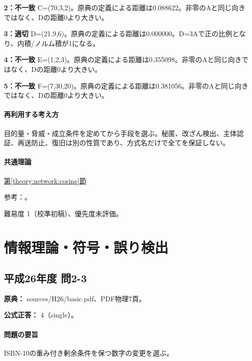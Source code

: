 \noindent\textbf{2：不一致} C=\allowbreak{}(70,3,2)。原典の定義による距離は0.088622。非零のAと同じ向きではなく、Dの距離0より大きい。\par

\noindent\textbf{3：適切} D=\allowbreak{}(21,9,6)。原典の定義による距離は0.000000。D=\allowbreak{}3Aで正の比例となり、内積/ノルム積が1になる。\par

\noindent\textbf{4：不一致} E=\allowbreak{}(1,2,3)。原典の定義による距離は0.355098。非零のAと同じ向きではなく、Dの距離0より大きい。\par

\noindent\textbf{5：不一致} F=\allowbreak{}(7,30,20)。原典の定義による距離は0.381056。非零のAと同じ向きではなく、Dの距離0より大きい。\par

\paragraph{再利用する考え方} 目的量・脅威・成立条件を定めてから手段を選ぶ。秘匿、改ざん検出、主体認証、再送防止、復旧は別の性質であり、方式名だけで全てを保証しない。

\paragraph{共通理論} \hyperref[theory:network:cosine]{第\ref*{theory:network:cosine}節}

\par 参考：\cite{net_cosine}。

\par 難易度 1（校準初稿）、優先度未評価。

\section{情報理論・符号・誤り検出}

\subsection{平成26年度 問2-3}
\label{q:h26-reg-basic-2-3}

\noindent\textbf{原典：} sources/H26/basic.pdf、PDF物理7頁。

\textbf{公式正答：} 4（single）。

\paragraph{問題の要旨} ISBN-10の重み付き剰余条件を保つ数字の変更を選ぶ。

